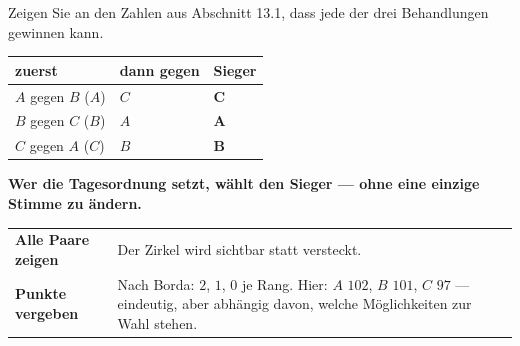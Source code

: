 \begin{aufgabe}
Zeigen Sie an den Zahlen aus Abschnitt 13.1, dass jede der drei Behandlungen gewinnen kann.

\loesung
{}
\begin{center}
{\small
\renewcommand{\arraystretch}{1.48}
\begin{tabular}{@{}P{3.0cm}P{2.4cm}P{2.2cm}@{}}
\toprule
\textbf{zuerst} & \textbf{dann gegen} & \textbf{Sieger}\\
\midrule
$A$ gegen $B$ ($A$) & $C$ & $\mathbf{C}$\\
$B$ gegen $C$ ($B$) & $A$ & $\mathbf{A}$\\
$C$ gegen $A$ ($C$) & $B$ & $\mathbf{B}$\\
\bottomrule
\end{tabular}}
\end{center}

\begin{center}
\begin{minipage}{0.9\textwidth}
\textbf{Wer die Tagesordnung setzt, wählt den Sieger --- ohne eine einzige Stimme zu ändern.}
\end{minipage}
\end{center}

\begin{center}
{\small
\renewcommand{\arraystretch}{1.5}
\begin{tabular}{@{}P{2.6cm}P{6.0cm}@{}}
\toprule
\textbf{Alle Paare zeigen} & Der Zirkel wird sichtbar statt versteckt.\\
\textbf{Punkte vergeben} & Nach Borda: $2$, $1$, $0$ je Rang. Hier: $A$ $102$, $B$ $101$, $C$ $97$ --- eindeutig, aber abhängig davon, welche Möglichkeiten zur Wahl stehen.\\
\bottomrule
\end{tabular}}
\end{center}

\begin{center}
\begin{minipage}{0.88\textwidth}
\end{minipage}
\end{center}
\end{aufgabe}

